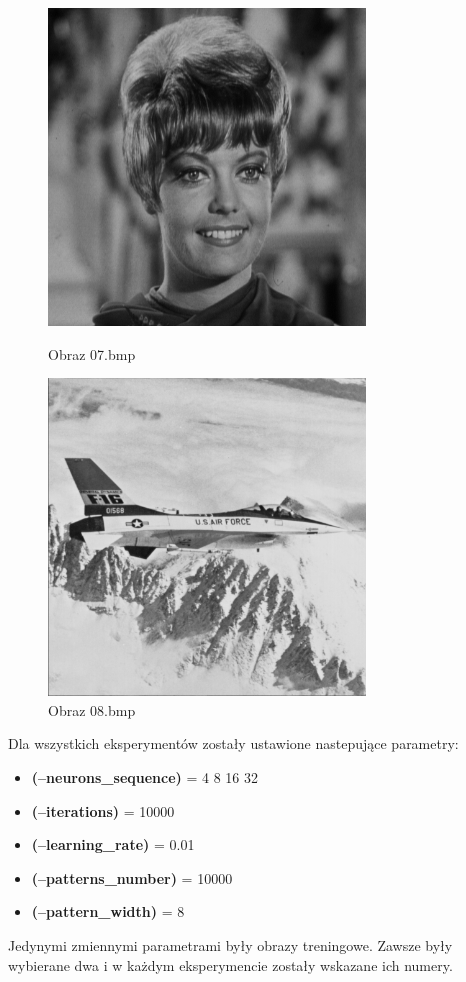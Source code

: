 \documentclass[../EDI_Task4_Karwowski_Kowalewski.tex]{subfiles}
\begin{document}
{    \begin{figure}[!htbp]
        \begin{minipage}[c]{0.49\linewidth}
            \centering
            \includegraphics[width=0.75\textwidth]{img/original/07.png}
            \caption{Obraz 07.bmp}
        \end{minipage}\hfill
        \begin{minipage}[c]{0.49\linewidth}
            \centering
            \includegraphics[width=0.75\textwidth]{img/original/08.png}
            \caption{Obraz 08.bmp}
        \end{minipage}
    \end{figure}
    \FloatBarrier

    Dla wszystkich eksperymentów zostały ustawione nastepujące parametry:
    \begin{itemize}
        \item \textbf{(--neurons\_sequence)} = 4 8 16 32
        \item \textbf{(--iterations)} = 10000
        \item \textbf{(--learning\_rate)} = 0.01
        \item \textbf{(--patterns\_number)} = 10000
        \item \textbf{(--pattern\_width)} = 8
    \end{itemize}
    Jedynymi zmiennymi parametrami były obrazy treningowe. Zawsze były wybierane dwa i
    w każdym eksperymencie zostały wskazane ich numery.
}
\end{document}
